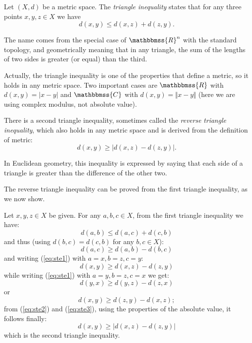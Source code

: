 \documentclass{article}
\newcommand{\C}{\mathbbmss{C}}
\newcommand{\R}{\mathbbmss{R}}
\begin{document}
Let $(X,d)$ be a metric space. The \emph{triangle inequality} states
that for any three points $x,y,z\in X$ we have
\[
  d(x,y) \le d(x,z) + d(z,y).
\]

The name comes from the special case of $\R^n$ with the standard
topology, and geometrically meaning that in any triangle, the sum of
the lengths of two sides is greater (or equal) than the third.

Actually, the triangle inequality is one of the properties that define
a metric, so it holds in any metric space. Two important cases are
$\R$ with $d(x,y)=|x-y|$ and $\C$ with $d(x,y)=\Vert x-y\Vert$ (here
we are using complex modulus, not absolute value).

There is a second triangle inequality, sometimes called the
\emph{reverse triangle inequality}, which also holds in any metric
space and is derived from the definition of metric:
\[
  d(x,y) \ge |d(x,z) - d(z,y)|.
\]

In Euclidean geometry, this inequality is expressed by saying that each
side of a triangle is greater than the difference of the other two.

The reverse triangle inequality can be proved from the first triangle 
inequality, as we now show.

Let $x, y, z \in X$ be given. For any $a,b,c \in X$, from the first
triangle inequality we have:
\[
  d(a,b) \le d(a,c) + d(c,b)
\]
and thus (using $d(b,c) = d(c,b)$ for any $b, c \in X$):
\begin{equation}\label{eq:ste1}
d(a,c) \ge d(a,b) - d(b,c)
\end{equation}
and writing (\ref{eq:ste1}) with $a=x, b=z, c=y$:
\begin{equation}\label{eq:ste2}
d(x,y) \ge d(x,z) - d(z,y)
\end{equation}
while writing (\ref{eq:ste1}) with $a=y, b=z, c=x$ we get:
\[
  d(y,x) \ge d(y,z) - d(z,x)
\]
or
\begin{equation}\label{eq:ste3}
d(x,y) \ge d(z,y) - d(x,z);
\end{equation}
from (\ref{eq:ste2}) and (\ref{eq:ste3}), using the properties of the
absolute value, it follows finally:
\[
  d(x,y) \ge \left|d(x,z) - d(z,y)\right|
\]
which is the second triangle inequality.
\end{document}
